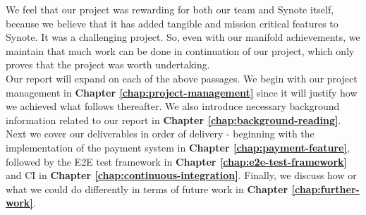 We feel that our project was rewarding for both our team and Synote itself, because we believe that it has added tangible and mission critical features to Synote. It was a challenging project. So, even with our manifold achievements, we maintain that much work can be done in continuation of our project, which only proves that the project was worth undertaking.\\

Our report will expand on each of the above passages. We begin with our project management in \textbf{Chapter \ref{chap:project-management}} since it will justify how we achieved what follows thereafter. We also introduce necessary background information related to our report in \textbf{Chapter \ref{chap:background-reading}}. Next we cover our deliverables in order of delivery - beginning with the implementation of the payment system in \textbf{Chapter \ref{chap:payment-feature}}, followed by the E2E test framework in \textbf{Chapter \ref{chap:e2e-test-framework}} and CI in \textbf{Chapter \ref{chap:continuous-integration}}. Finally, we discuss how or what we could do differently in terms of future work in \textbf{Chapter \ref{chap:further-work}}.
